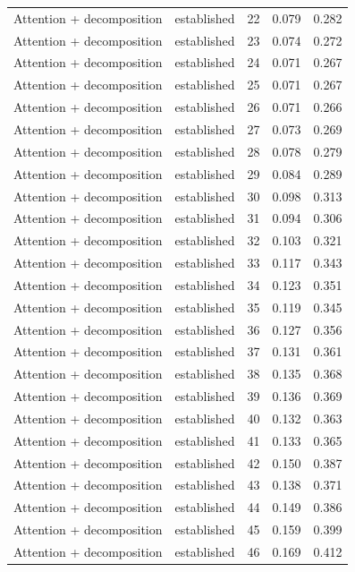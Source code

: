 \begin{tabular}{llrrr}
Attention + decomposition & established & 22 & 0.079 & 0.282 \\
Attention + decomposition & established & 23 & 0.074 & 0.272 \\
Attention + decomposition & established & 24 & 0.071 & 0.267 \\
Attention + decomposition & established & 25 & 0.071 & 0.267 \\
Attention + decomposition & established & 26 & 0.071 & 0.266 \\
Attention + decomposition & established & 27 & 0.073 & 0.269 \\
Attention + decomposition & established & 28 & 0.078 & 0.279 \\
Attention + decomposition & established & 29 & 0.084 & 0.289 \\
Attention + decomposition & established & 30 & 0.098 & 0.313 \\
Attention + decomposition & established & 31 & 0.094 & 0.306 \\
Attention + decomposition & established & 32 & 0.103 & 0.321 \\
Attention + decomposition & established & 33 & 0.117 & 0.343 \\
Attention + decomposition & established & 34 & 0.123 & 0.351 \\
Attention + decomposition & established & 35 & 0.119 & 0.345 \\
Attention + decomposition & established & 36 & 0.127 & 0.356 \\
Attention + decomposition & established & 37 & 0.131 & 0.361 \\
Attention + decomposition & established & 38 & 0.135 & 0.368 \\
Attention + decomposition & established & 39 & 0.136 & 0.369 \\
Attention + decomposition & established & 40 & 0.132 & 0.363 \\
Attention + decomposition & established & 41 & 0.133 & 0.365 \\
Attention + decomposition & established & 42 & 0.150 & 0.387 \\
Attention + decomposition & established & 43 & 0.138 & 0.371 \\
Attention + decomposition & established & 44 & 0.149 & 0.386 \\
Attention + decomposition & established & 45 & 0.159 & 0.399 \\
Attention + decomposition & established & 46 & 0.169 & 0.412 \\

\end{tabular}
